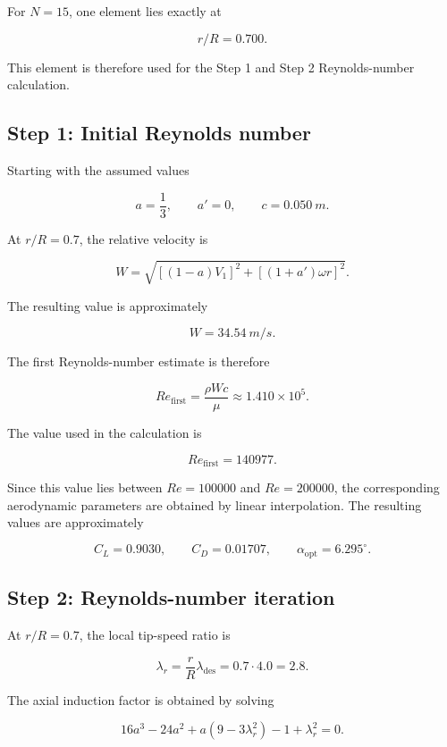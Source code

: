\documentclass[11pt,a4paper]{article}
\begin{document}
For $N=15$, one element lies exactly at

\[
    r/R=0.700.
\]

This element is therefore used for the Step 1 and Step 2 Reynolds-number
calculation.

\subsection{Step 1: Initial Reynolds number}

Starting with the assumed values

\[
a=\frac{1}{3},
\qquad
a'=0,
\qquad
c=\SI{0.050}{m}.
\]

At $r/R=0.7$, the relative velocity is

\begin{equation}
W=
\sqrt{
[(1-a)V_1]^2+
[(1+a')\omega r]^2
}.
\end{equation}

The resulting value is approximately

\[
W=\SI{34.54}{m/s}.
\]

The first Reynolds-number estimate is therefore

\begin{equation}
Re_{\mathrm{first}}
=
\frac{\rho Wc}{\mu}
\approx
1.410\times10^5.
\end{equation}

The value used in the calculation is

\[
\boxed{Re_{\mathrm{first}}=140977}.
\]

Since this value lies between $Re=100000$ and $Re=200000$, the corresponding
aerodynamic parameters are obtained by linear interpolation. The resulting
values are approximately

\[
C_L=0.9030,
\qquad
C_D=0.01707,
\qquad
\alpha_{\mathrm{opt}}=6.295^\circ.
\]

\subsection{Step 2: Reynolds-number iteration}

At $r/R=0.7$, the local tip-speed ratio is

\begin{equation}
\lambda_r
=
\frac{r}{R}\lambda_{\mathrm{des}}
=
0.7\cdot4.0
=
2.8.
\end{equation}

The axial induction factor is obtained by solving

\begin{equation}
16a^3-24a^2+a(9-3\lambda_r^2)-1+\lambda_r^2=0.
\end{equation}
\end{document}
